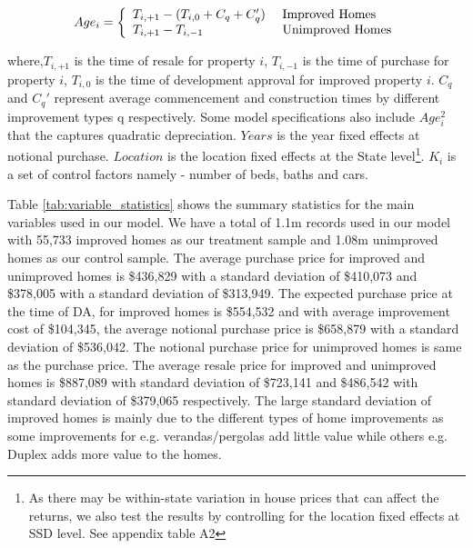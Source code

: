 \documentclass[AEJ,reqno, draftmode]{AEA} %
\begin{document}
\begin{equation}
    Age_i = \left\{
    \begin{array}{l l}
      T_{i,+1}-(T_{i,0} + C_q + C_q') & \text{ Improved Homes}\\
      T_{i,+1}-T_{i,-1}  & \text{ Unimproved Homes} \\
    \end{array} \right.
\end{equation}

where,$T_{i,+1}$ is the time of resale for property $i$, $T_{i,-1}$ is the time of purchase for property $i$, $T_{i,0}$ is the time of development approval for improved property $i$. $C_q$ and $C_q'$ represent average commencement and construction times by different improvement types q respectively. Some model specifications also include $Age_i^2$ that the captures quadratic depreciation. $Years$ is the year fixed effects at notional purchase. $Location$ is the location fixed effects at the State level\footnote{As there may be within-state variation in house prices that can affect the returns, we also test the results by controlling for the location fixed effects at SSD level. See appendix table A2}. $K_i$ is a set of control factors namely - number of beds, baths and cars.






Table \ref{tab:variable_statistics} shows the summary statistics for the main variables used in our model. We have a total of 1.1m records used in our model with 55,733 improved homes as our treatment sample and 1.08m unimproved homes as our control sample. The average purchase price for improved and unimproved homes is \$436,829 with a standard deviation of \$410,073 and \$378,005 with a standard deviation of \$313,949. The expected purchase price at the time of DA, for improved homes is \$554,532 and with average improvement cost of \$104,345, the average notional purchase price is \$658,879 with a standard deviation of \$536,042. The notional purchase price for unimproved homes is same as the purchase price. The average resale price for improved and unimproved homes is \$887,089 with standard deviation of \$723,141 and \$486,542 with standard deviation of \$379,065 respectively. The large standard deviation of improved homes is mainly due to the different types of home improvements as some improvements for e.g. verandas/pergolas add little value while others e.g. Duplex adds more value to the homes.
\end{document}
